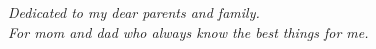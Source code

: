 

\thispagestyle{empty}


\vspace*{9cm}

\begin{center}
\slshape
Dedicated to my dear parents and family.\\
For mom and dad who always know the best things for me.
\end{center}

